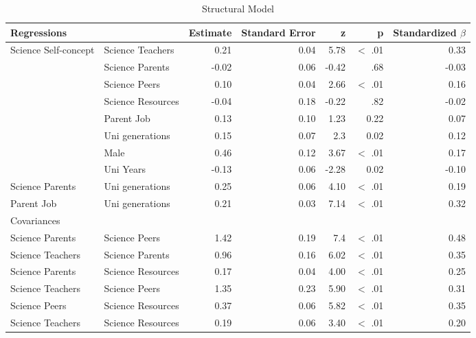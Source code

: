 \documentclass[smallextended]{svjour3}       %
\begin{document}
\begin{landscape}
\begin{table}[ht]
\caption{Structural Model} 

\centering
\begin{tabular}{llrrrrr}
  \hline
 Regressions &  & Estimate & Standard Error & z & p & Standardized $\beta$ \\ 
  \hline

  Science Self-concept & Science Teachers & 0.21 & 0.04 & 5.78 & $<$ .01 & 0.33 \\ 
   & Science Parents & -0.02 & 0.06 & -0.42 & .68 & -0.03 \\ 
   & Science Peers & 0.10 & 0.04 & 2.66 & $<$ .01 & 0.16 \\ 
   & Science Resources & -0.04 & 0.18 & -0.22 & .82 & -0.02 \\ 
   & Parent Job & 0.13 & 0.10 & 1.23 & 0.22 & 0.07 \\ 
   & Uni generations & 0.15 & 0.07 & 2.3 & 0.02 & 0.12 \\ 
   & Male & 0.46 & 0.12 & 3.67 & $<$ .01 & 0.17 \\ 
   & Uni Years & -0.13 & 0.06 & -2.28 & 0.02 & -0.10 \\ 
  Science Parents & Uni generations & 0.25 & 0.06 & 4.10 & $<$ .01 & 0.19 \\ 
  Parent Job & Uni generations & 0.21 & 0.03 & 7.14 & $<$ .01 & 0.32 \\ 
  \hline
Covariances &  &  &  &  & &  \\ 
  \hline
  Science Parents & Science Peers & 1.42 & 0.19 & 7.4 & $<$ .01 & 0.48 \\ 
  Science Teachers & Science Parents & 0.96 & 0.16 & 6.02 & $<$ .01 & 0.35 \\ 
  Science Parents & Science Resources & 0.17 & 0.04 & 4.00 & $<$ .01 & 0.25 \\ 
  Science Teachers & Science Peers & 1.35 & 0.23 & 5.90 & $<$ .01 & 0.31 \\ 
  Science Peers & Science Resources & 0.37 & 0.06 & 5.82 & $<$ .01 & 0.35 \\ 
  Science Teachers & Science Resources & 0.19 & 0.06 & 3.40 & $<$ .01 & 0.20 \\ 
   

\end{tabular}
\end{table}
\end{landscape}
\end{document}
